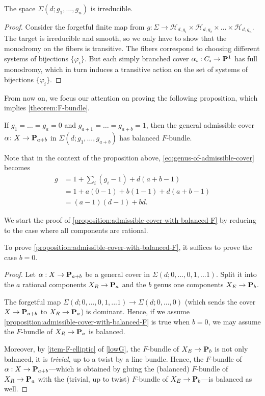\documentclass[11pt, two side, letterpaper, final]{amsart}
\renewcommand{\P}{{\bf P}}
\newcommand {\from}{\colon}
\renewcommand{\H}{{\mathcal{H}}}
\renewcommand{\phi}{\varphi}
\newcommand{\chain}[1]{\P_{#1}}
\begin{document}
\begin{lemma}
The space $\Sigma(d;g_1,\ldots, g_n) $ is irreducible.
\end{lemma}
\begin{proof}
Consider the forgetful finite map from $g:\Sigma \to \H_{d,g_1} \times \H_{d,g_2} \times \ldots \times \H_{d,g_n}$. The target is irreducible and smooth, so we only have to show that the monodromy on the fibers is transitive. The fibers
correspond to choosing different systems of bijections $\{ \phi_i \}$. But each simply branched cover $\alpha_i: C_i \to \P^1$ has full
monodromy, which in turn induces a transitive action on the set of systems of bijections $\{ \phi_{i} \}$.
\end{proof}

 From now on, we focus our attention on proving the following proposition, which  implies \cref{theorem:F-bundle}.
\begin{proposition}
\label{proposition:admissible-cover-with-balanced-F}
If $g_1=\ldots=g_a=0$ and $g_{a+1}=\ldots=g_{a+b}=1$, then the general admissible cover $\alpha \from X \to \chain{a+b}$
in  $\Sigma(d;g_1,\ldots, g_{a+b})$ has balanced $F$-bundle.
\end{proposition}
Note that in the context of the proposition above, \cref{eq:genus-of-admissible-cover} becomes
\begin{align*}
	g&=1+ \sum_i (g_i -1) + d(a+b-1)\\
	 &= 1+ a(0-1) +b(1-1) + d(a+b-1) \\
	 &= (a-1)(d-1)+bd.
\end{align*}

We start the proof of \cref{proposition:admissible-cover-with-balanced-F} by reducing to the case where all components
are rational.
\begin{lemma}\label{lemma:reduction-to-rational}
To prove \cref{proposition:admissible-cover-with-balanced-F}, it suffices to prove the case $b=0$.
\end{lemma}
\begin{proof}
Let $\alpha:X \to \chain{a+b}$ be a general cover in $\Sigma(d;0, ...,  0,1 , ...1)$. Split it into the $a$ rational
components $X_R \to \chain{a}$ and the $b$ genus one components $X_E \to \chain{b}$.

The forgetful map $\Sigma(d;0, ...,  0,1 , ...1) \to \Sigma(d;0, ..., 0)$ (which sends the cover $X \to \chain{a+b}$ to $X_R \to \chain{a}$) is dominant. Hence, if we assume \cref{proposition:admissible-cover-with-balanced-F} is true when $b=0$, we may assume the $F$-bundle of $X_R \to \chain{a}$ is balanced.

Moreover, by \cref{item-F-elliptic} of \cref{lowG}, the $F$-bundle of $X_E \to \chain{b}$ is not only balanced, it is \emph{trivial}, up to a twist by a line bundle. Hence, the $F$-bundle of $\alpha: X\to \chain{a+b}$---which is obtained by gluing the 
(balanced) $F$-bundle of $X_R \to \chain{a}$ with the (trivial, up to twist) $F$-bundle of $X_E \to \chain{b}$---is balanced as well.
\end{proof}
\end{document}
